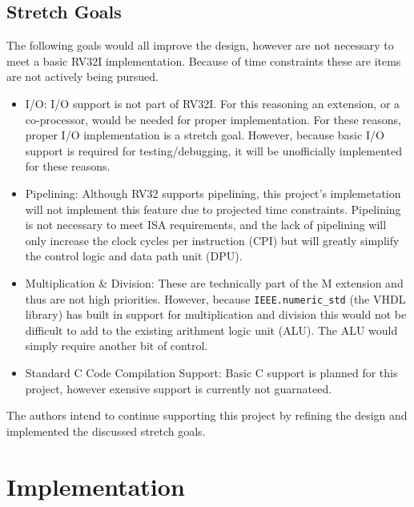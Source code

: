 \documentclass[lettersize,journal]{IEEEtran}
\begin{document}
\subsection{Stretch Goals}
The following goals would all improve the design, however are not necessary to meet a basic RV32I implementation.
Because of time constraints these are items are not actively being pursued.
\begin{itemize}
    \item I/O: I/O support is not part of RV32I. For this reasoning an extension, or a co-processor, would be needed for proper implementation.
        For these reasons, proper I/O implementation is a stretch goal. However, because basic I/O support is required for testing/debugging, it will be unofficially
        implemented for these reasons.
    \item Pipelining: Although RV32 supports pipelining, this project's implemetation will not implement this feature due to projected time constraints.
        Pipelining is not necessary to meet ISA requirements, and the lack of pipelining will only increase the clock cycles per instruction (CPI) but will greatly
        simplify the control logic and data path unit (DPU).
    \item Multiplication \& Division: These are technically part of the M extension \cite{riscvunprovisioned} and thus are not high priorities.
        However, because \verb|IEEE.numeric_std| (the VHDL library) has built in support for multiplication and division this would not be difficult to add to
        the existing arithment logic unit (ALU). The ALU would simply require another bit of control.
    \item Standard C Code Compilation Support: Basic C support is planned for this project, however exensive support is currently not guarnateed.
\end{itemize}
The authors intend to continue supporting this project by refining the design and implemented the discussed stretch goals.
 
\section{Implementation}
\end{document}
